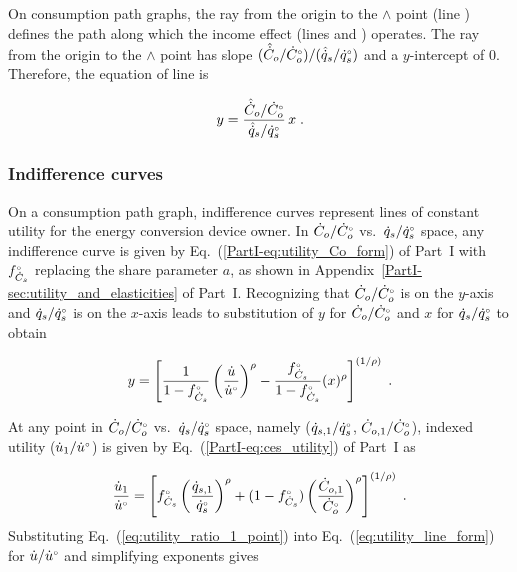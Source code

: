 On consumption path graphs, 
the ray from the origin to the $\wedge$ point 
(line \rr{})
defines the path along which the income effect
(lines \hatd{} and \dbar{})
operates.
The ray from the origin to the $\wedge$ point
has slope $(\hat{\dot{C}}_o/{}{\dot{C}}^{\scriptscriptstyle \circ}_o) / (\hat{\dot{q}}_s/{}{\dot{q}}^{\scriptscriptstyle \circ}_s)$
and a $y$-intercept of 0.
Therefore, the equation of line \rr{} is

\begin{equation} \label{eq:ray_cons}
  y = \frac{\hat{\dot{C}}_o/{}{\dot{C}}^{\scriptscriptstyle \circ}_o}{\hat{\dot{q}}_s/{}{\dot{q}}^{\scriptscriptstyle \circ}_s} \, x \; .
\end{equation}


\subsubsection{Indifference curves} 
\label{sec:cons_graph_indifference_curves}

On a consumption path graph, 
indifference curves represent lines of constant utility
for the energy conversion device owner.
In $\dot{C}_o/{}{\dot{C}}^{\scriptscriptstyle \circ}_o$ vs.\ $\dot{q}_s/{}{\dot{q}}^{\scriptscriptstyle \circ}_s$ space, 
any indifference curve 
is given by 
Eq.~(\ref{PartI-eq:utility_Co_form}) of Part~I
with ${}{f}^{\scriptscriptstyle \circ}_{\dot{C}_s}$ replacing the share parameter $a$, 
as shown in Appendix~\ref{PartI-sec:utility_and_elasticities} of Part~I.
Recognizing that 
$\dot{C}_o/{}{\dot{C}}^{\scriptscriptstyle \circ}_o$ is on the $y$-axis and 
$\dot{q}_s/{}{\dot{q}}^{\scriptscriptstyle \circ}_s$ is on the $x$-axis
leads to substitution of 
$y$ for $\dot{C}_o/{}{\dot{C}}^{\scriptscriptstyle \circ}_o$ and 
$x$ for $\dot{q}_s/{}{\dot{q}}^{\scriptscriptstyle \circ}_s$ to obtain

\begin{equation} \label{eq:utility_line_form}
  y = \left[ \frac{1}{1 - {}{f}^{\scriptscriptstyle \circ}_{\dot{C}_s}} \left( \frac{\dot{u}}{{}{\dot{u}}^{\scriptscriptstyle \circ}} \right)^\rho 
            - \frac{{}{f}^{\scriptscriptstyle \circ}_{\dot{C}_s}}{1 - {}{f}^{\scriptscriptstyle \circ}_{\dot{C}_s}} (x)^\rho \right]^{(1/\rho)} \; .
\end{equation}

At any point in 
$\dot{C}_o/{}{\dot{C}}^{\scriptscriptstyle \circ}_o$ vs.\ $\dot{q}_s/{}{\dot{q}}^{\scriptscriptstyle \circ}_s$ space,
namely ($\dot{q}_{s,1}/{}{\dot{q}}^{\scriptscriptstyle \circ}_s$, $\dot{C}_{o,1}/{}{\dot{C}}^{\scriptscriptstyle \circ}_o$),
indexed utility ($\dot{u}_1/{}{\dot{u}}^{\scriptscriptstyle \circ}$) is given by Eq.~(\ref{PartI-eq:ces_utility}) of Part~I as

\begin{equation} \label{eq:utility_ratio_1_point}
  \frac{\dot{u}_1}{{}{\dot{u}}^{\scriptscriptstyle \circ}} =
        \left[ {}{f}^{\scriptscriptstyle \circ}_{\dot{C}_s} \left( \frac{\dot{q}_{s,1}}{{}{\dot{q}}^{\scriptscriptstyle \circ}_s} \right)^\rho
        + (1-{}{f}^{\scriptscriptstyle \circ}_{\dot{C}_s}) \left( \frac{\dot{C}_{o,1}}{{}{\dot{C}}^{\scriptscriptstyle \circ}_o} \right)^\rho  \right]^{(1/\rho)} \; .
\end{equation}
%
Substituting Eq.~(\ref{eq:utility_ratio_1_point}) into Eq.~(\ref{eq:utility_line_form})
for $\dot{u}/{}{\dot{u}}^{\scriptscriptstyle \circ}$
and simplifying exponents gives

